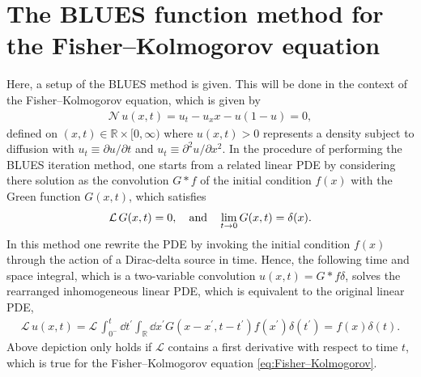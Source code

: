 \documentclass[amsmath,amssymb,amsfonts,aps,pre,preprint,superscriptaddress,bibnotes,showpacs,showkeys,longbibliography]{revtex4-1}
\newcommand*{\lop}{\mathcal{L}\,}
\newcommand*{\nlop}{\mathcal{N}\,}
\begin{document}
\section{The BLUES function method for the Fisher–Kolmogorov equation}\label{sec:BLUES_method_pde}
Here, a setup of the BLUES method is given. This will be done in the context of the Fisher–Kolmogorov equation, which is given by
\begin{align}\label{eq:Fisher–Kolmogorov}
    \nlop u(x,t)=u_t - u_xx -u(1-u)=0,
\end{align}
defined on $(x,t) \in \mathbb{R} \times [0,\infty)$ where $u(x,t)>0$ represents a density subject to diffusion with $u_t\equiv\partial u / \partial t$ and $u_t\equiv\partial^2 u / \partial x^2$. In the procedure of performing the BLUES iteration method, one starts from a related linear PDE by considering there solution as the convolution $G*f$ of the initial condition $f(x)$ with the Green function $G(x,t)$, which satisfies
\begin{align}
    \label{eq:linear_operator_delta_G}
    \lop G(x,t)=0, \qq{and} \lim_{t\to 0}G(x,t)=\delta(x).
\end{align}
In this method one rewrite the PDE by invoking the initial condition $f(x)$ through the action of a Dirac-delta source in time. Hence, the following time and space integral, which is a two-variable convolution $u(x, t) = G \ast f \delta$, solves the rearranged inhomogeneous linear PDE, which is equivalent to the original linear PDE,
\begin{align}
 \label{eq:rewriten_linear_operator_delta_u}
	\lop u(x, t)=\lop \int_{0^{-}}^{t} \dd{t^{\prime}} \int_{\mathbb{R}} \dd{x^{\prime}} G\left(x-x^{\prime}, t-t^{\prime}\right) f\left(x^{\prime}\right) \delta\left(t^{\prime}\right)=f(x) \delta(t).
\end{align}
Above depiction only holds if $\mathcal{L}$ contains a first derivative with respect to time $t$, which is true for the Fisher–Kolmogorov equation \eqref{eq:Fisher–Kolmogorov}. 
\end{document}
